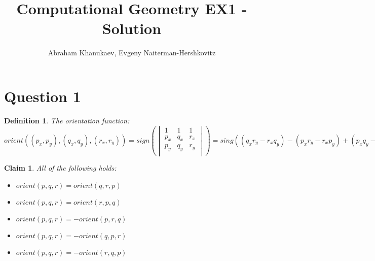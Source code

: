 \documentclass{article}
\title{Computational Geometry EX1 - Solution}
\author{Abraham Khanukaev, Evgeny Naiterman-Hershkovitz}
\date{}
\newtheorem{definition}[theorem]{Definition}
\newtheorem{claim}[theorem]{Claim}
\begin{document}
\maketitle
\section{Question 1}

\begin{definition}
    The orientation function:
    \begin{equation*}
        orient((p_x, p_y), (q_x, q_y), (r_x, r_y)) = sign\left(
        \begin{vmatrix}
            1 & 1 & 1\\
            p_x & q_x & r_x\\
            p_y & q_y & r_y\\
        \end{vmatrix}
        \right)
        = sing((q_xr_y - r_xq_y) - (p_xr_y-r_xp_y) + (p_xq_y - q_xp_y))
    \end{equation*}
\end{definition}

\begin{claim}
All of the following holds:
\begin{itemize}
    \item $orient(p,q,r) = orient(q, r, p)$
    \item $orient(p,q,r) = orient(r, p, q)$
    \item $orient(p,q,r) = -orient(p, r, q)$
    \item $orient(p,q,r) = -orient(q, p, r)$
    \item $orient(p,q,r) = -orient(r, q, p)$
\end{itemize}
\end{claim}
\end{document}
